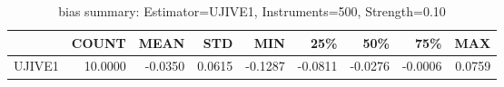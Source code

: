 \begin{table}[ht]
\centering
\caption{bias summary: Estimator=UJIVE1, Instruments=500, Strength=0.10}
\begin{tabular}{lrrrrrrrr}
\toprule
 & COUNT & MEAN & STD & MIN & 25\% & 50\% & 75\% & MAX \\
\midrule
UJIVE1 & 10.0000 & -0.0350 & 0.0615 & -0.1287 & -0.0811 & -0.0276 & -0.0006 & 0.0759 \\
\bottomrule
\end{tabular}
\end{table}
